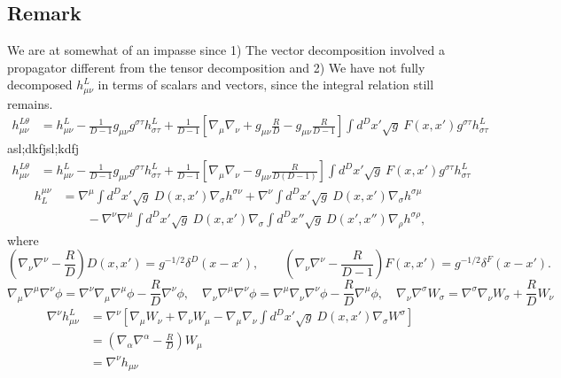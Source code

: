 \documentclass[10pt,letterpaper]{article}
\begin{document}
\subsection*{Remark}
We are at somewhat of an impasse since 1) The vector decomposition involved a propagator different from the tensor decomposition and 2) We have not fully decomposed $h_{\mu\nu}^L$ in terms of scalars and vectors, since the integral relation still remains. 
\begin{align}
h_{\mu\nu}^{L\theta} &= h_{\mu\nu}^L - \frac{1}{D-1} g_{\mu\nu} g^{\sigma\tau}h^L_{\sigma\tau} +\frac{1}{D-1}
\left[ \nabla_\mu\nabla_\nu + g_{\mu\nu}\frac{R}{D} - g_{\mu\nu}\frac{R}{D-1}\right] \int d^Dx' \sqrt{g}\ F(x,x')g^{\sigma\tau}h_{\sigma\tau}^L 
\end{align}
asl;dkfjsl;kdfj
\begin{align}
h_{\mu\nu}^{L\theta} &= h_{\mu\nu}^L - \frac{1}{D-1} g_{\mu\nu} g^{\sigma\tau}h^L_{\sigma\tau} +\frac{1}{D-1}
\left[ \nabla_\mu\nabla_\nu- g_{\mu\nu}\frac{R}{D(D-1)}\right] \int d^Dx' \sqrt{g}\ F(x,x')g^{\sigma\tau}h_{\sigma\tau}^L 
\end{align}
\begin{align}
  h^{\mu\nu}_L&=\nabla^\mu \int d^Dx' \sqrt{g}\ D(x,x')\nabla_\sigma h^{\sigma\nu} + \nabla^\nu \int d^Dx' \sqrt{g}\  D(x,x')\nabla_\sigma h^{\sigma\mu} 
\\
&\qquad -  
 \nabla^\nu\nabla^\mu \int d^Dx'\sqrt{g}\  D(x,x') \nabla_\sigma \int d^Dx'' \sqrt{g}\ D(x',x'')\nabla_\rho h^{\sigma\rho},
\end{align}
where
\begin{equation}
\left( \nabla_\nu \nabla^\nu -\frac{R}{D} \right)D(x,x') = g^{-1/2} \delta^D(x-x'),\qquad \left( \nabla_\nu \nabla^\nu -\frac{R}{D-1} \right)F(x,x') = g^{-1/2} \delta^F(x-x').
\end{equation}
\begin{equation}
\nabla_\mu \nabla^\mu \nabla^\nu \phi = \nabla^\nu \nabla_\mu \nabla^\mu \phi - \frac{R}{D}\nabla^\nu \phi,
\quad \nabla_\nu \nabla^\mu \nabla^\nu \phi = \nabla^\mu \nabla_\nu \nabla^\nu \phi - \frac{R}{D}\nabla^\mu \phi,\quad
\nabla_\nu \nabla^\sigma W_{\sigma} = \nabla^\sigma \nabla_\nu W_{\sigma} + \frac{R}{D}W_{\nu}
\end{equation}
\begin{align}
\nabla^\nu h_{\mu\nu}^L &= 
\nabla^\nu\left[ \nabla_\mu W_\nu + \nabla_\nu W_\mu - \nabla_\mu\nabla_\nu
 \int d^Dx'\sqrt{g}\  D(x,x') \nabla_\sigma W^\sigma\right]
\nonumber\\
&=
\left(\nabla_\alpha \nabla^\alpha - \frac{R}{D}\right)W_\mu
\nonumber\\
&= \nabla^\nu h_{\mu\nu}
\end{align}
\end{document}
